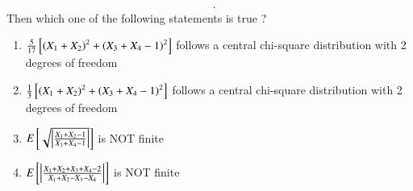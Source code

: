 \documentclass[journal]{IEEEtran}
\begin{document}
\begin{enumerate}
\begin{align*}
{\begin{matrix}
\end{matrix}}.
\end{align*}
Then which one of the following statements is true ?
\begin{enumerate}
    \item $\frac{5}{17} {}\left[\left(X_1 + X_2\right)^2 + \left(X_3 + X_4 - 1\right)^2\right]$ follows a central chi-square distribution with 2 degrees of freedom
    \item $\frac{1}{3} {}\left[\left(X_1 + X_2\right)^2 + \left(X_3 + X_4 - 1\right)^2\right]$ follows a central chi-square distribution with 2 degrees of freedom
    \item $E {}\left[\sqrt{\left\vert\frac{X_1 + X_2 - 1}{X_3 + X_4 - 1}\right\vert}\right]$ is NOT finite
    \item $E {}\left[\left\vert\frac{X_1 + X_2 + X_3 + X_4 - 2}{X_1 + X_2 - X_3 - X_4}\right\vert\right]$ is NOT finite \\
\end{enumerate}
			 \end{enumerate}
			 
\end{document}
